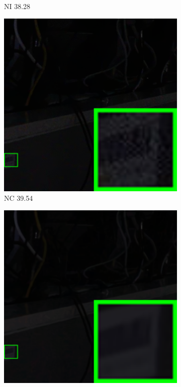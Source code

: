 \begin{figure}
\begin{subfigure}[t]{0.19\textwidth}
		\caption{NI 38.28}
    \end{subfigure}
    \hfill
    \begin{subfigure}[t]{0.19\textwidth}
        \centering
        \includegraphics[width=1\textwidth]{images/guided/our/resize_br_NC_SONY_A7II_ISO6400_DSC03017_part5.png}
\caption{NC 39.54}
    \end{subfigure}
    \hfill   
    \begin{subfigure}[t]{0.19\textwidth}
        \centering
        \includegraphics[width=1\textwidth]{images/guided/our/resize_br_Guided_SONY_A7II_ISO6400_DSC03017_part5.png}

\end{subfigure}
\end{figure}
